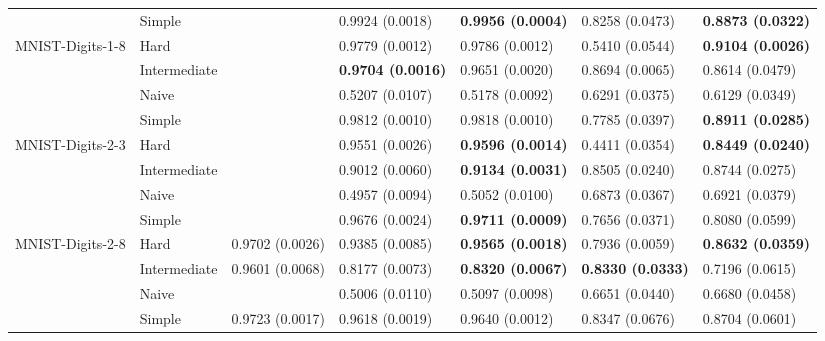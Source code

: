 \begin{tabular}{lllllll}
                 & Simple &                  &           0.9924 (0.0018) &  \textbf{0.9956 (0.0004)} &           0.8258 (0.0473) &  \textbf{0.8873 (0.0322)} \\
MNIST-Digits-1-8 & Hard &                  &           0.9779 (0.0012) &           0.9786 (0.0012) &           0.5410 (0.0544) &  \textbf{0.9104 (0.0026)} \\
                 & Intermediate &                  &  \textbf{0.9704 (0.0016)} &           0.9651 (0.0020) &           0.8694 (0.0065) &           0.8614 (0.0479) \\
                 & Naive &                  &           0.5207 (0.0107) &           0.5178 (0.0092) &           0.6291 (0.0375) &           0.6129 (0.0349) \\
                 & Simple &                  &           0.9812 (0.0010) &           0.9818 (0.0010) &           0.7785 (0.0397) &  \textbf{0.8911 (0.0285)} \\
MNIST-Digits-2-3 & Hard &                  &           0.9551 (0.0026) &  \textbf{0.9596 (0.0014)} &           0.4411 (0.0354) &  \textbf{0.8449 (0.0240)} \\
                 & Intermediate &                  &           0.9012 (0.0060) &  \textbf{0.9134 (0.0031)} &           0.8505 (0.0240) &           0.8744 (0.0275) \\
                 & Naive &                  &           0.4957 (0.0094) &           0.5052 (0.0100) &           0.6873 (0.0367) &           0.6921 (0.0379) \\
                 & Simple &                  &           0.9676 (0.0024) &  \textbf{0.9711 (0.0009)} &           0.7656 (0.0371) &           0.8080 (0.0599) \\
MNIST-Digits-2-8 & Hard &  0.9702 (0.0026) &           0.9385 (0.0085) &  \textbf{0.9565 (0.0018)} &           0.7936 (0.0059) &  \textbf{0.8632 (0.0359)} \\
                 & Intermediate &  0.9601 (0.0068) &           0.8177 (0.0073) &  \textbf{0.8320 (0.0067)} &  \textbf{0.8330 (0.0333)} &           0.7196 (0.0615) \\
                 & Naive &                  &           0.5006 (0.0110) &           0.5097 (0.0098) &           0.6651 (0.0440) &           0.6680 (0.0458) \\
                 & Simple &  0.9723 (0.0017) &           0.9618 (0.0019) &           0.9640 (0.0012) &           0.8347 (0.0676) &           0.8704 (0.0601) \\

\end{tabular}
